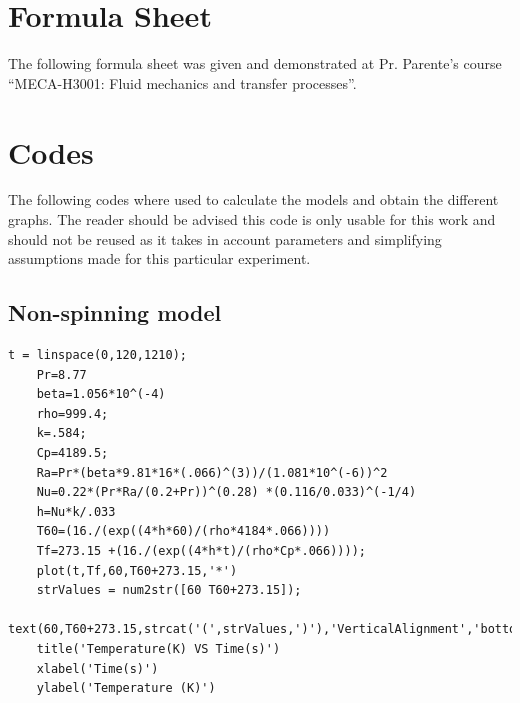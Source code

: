 \documentclass{report}
\begin{document}
	\chapter{Formula Sheet}\label{FORMU}
	
	The following formula sheet was given and demonstrated at Pr. Parente's course ``MECA-H3001: Fluid mechanics and transfer processes''.
	
	
	
	\chapter{Codes}
	
	The following codes where used to calculate the models and obtain the different graphs. The reader should be advised this code is only usable for this work and should not be reused as it takes in account parameters and simplifying assumptions made for this particular experiment.
	
	\section{Non-spinning model}\label{codeNS}
	
	\begin{lstlisting}[style=Matlab-editor]
	t = linspace(0,120,1210);
	Pr=8.77
	beta=1.056*10^(-4)
	rho=999.4;
	k=.584;
	Cp=4189.5;
	Ra=Pr*(beta*9.81*16*(.066)^(3))/(1.081*10^(-6))^2
	Nu=0.22*(Pr*Ra/(0.2+Pr))^(0.28) *(0.116/0.033)^(-1/4)
	h=Nu*k/.033
	T60=(16./(exp((4*h*60)/(rho*4184*.066))))
	Tf=273.15 +(16./(exp((4*h*t)/(rho*Cp*.066))));
	plot(t,Tf,60,T60+273.15,'*')
	strValues = num2str([60 T60+273.15]);
	text(60,T60+273.15,strcat('(',strValues,')'),'VerticalAlignment','bottom');
	title('Temperature(K) VS Time(s)')
	xlabel('Time(s)')
	ylabel('Temperature (K)')
	\end{lstlisting}
	
	
	{}
	
	
\end{document}
